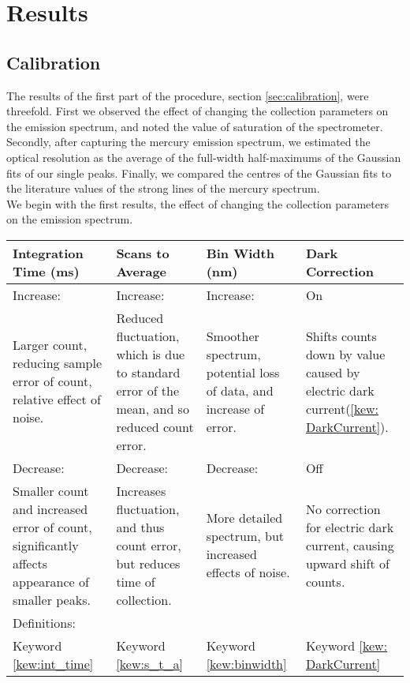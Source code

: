 \documentclass{article}
\begin{document}
\section{Results}
\subsection{Calibration}
The results of the first part of the procedure, section \ref{sec:calibration}, were threefold. First we observed the effect of changing the collection parameters on the emission spectrum, and noted the value of saturation of the spectrometer. Secondly, after capturing the mercury emission spectrum, we estimated the optical resolution as the average of the full-width half-maximums of the Gaussian fits of our single peaks. Finally, we compared the centres of the Gaussian fits to the literature values of the strong lines of the mercury spectrum.\\
\indent We begin with the first results, the effect of changing the collection parameters on the emission spectrum.\\
\begin{tabular}{p{}p{}p{}p{}}
    \hline
    \hline
    Integration Time (ms) & Scans to Average & Bin Width (nm) & Dark Correction\\
    \hline
    Increase: & Increase: & Increase: & On\\
    Larger count, reducing sample error of count, relative effect of noise. & Reduced fluctuation, which is due to standard error of the mean, and so reduced count error. &  Smoother spectrum, potential loss of data, and increase of error. & Shifts counts down by value caused by electric dark current(\ref{kew: DarkCurrent}).\\
    \hline
    Decrease: & Decrease: & Decrease: & Off\\
    Smaller count and increased error of count, significantly affects appearance of smaller peaks. & Increases fluctuation, and thus count error, but reduces time of collection. & More detailed spectrum, but increased effects of noise. & No correction for electric dark current, causing upward shift of counts.\\
    \hline
    Definitions: &~&~&~\\
    Keyword \ref{kew:int_time}& Keyword \ref{kew:s_t_a}& Keyword \ref{kew:binwidth}& Keyword \ref{kew: DarkCurrent}\\
    \hline
    \hline
\end{tabular}
\end{document}
